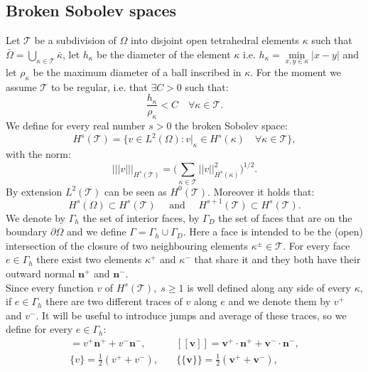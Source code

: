 \documentclass[12pt, a4paper]{article}
\theoremstyle{definition}
\theoremstyle{plain}
\theoremstyle{plain}
\theoremstyle{definition}
\begin{document}
\subsection{Broken Sobolev spaces}
Let $\mathcal{T}$ be a subdivision of $\Omega$ into disjoint open tetrahedral elements $\kappa$ such that $\bar{\Omega} = \bigcup\limits_{\kappa \in \mathcal{T}} \bar{\kappa}$, let $h_\kappa$ be the diameter of the element $\kappa$ i.e. $h_\kappa = \min\limits_{x, y \in \kappa} |x-y|$ and let $\rho_\kappa$ be the maximum diameter of a ball inscribed in $\kappa$. For the moment we assume $\mathcal{T}$ to be regular, i.e. that $\exists C > 0$ such that:
\begin{equation*}
	\frac{h_\kappa}{\rho_\kappa} < C \quad \forall \kappa \in \mathcal{T}.
\end{equation*}
We define for every real number $s>0$ the broken Sobolev space:
\begin{equation*}
	H^s(\mathcal{T}) = \{ v \in L^2(\Omega) : v|_\kappa \in H^s(\kappa) \quad 
	\forall \kappa \in \mathcal{T} \},
\end{equation*}
with the norm:
\begin{equation*}
	|\!|\!|v|\!|\!|_{H^s(\mathcal{T})} = \bigg( \sum_{\kappa \in \mathcal{T}} |\!|v|\!|_{H^s(\kappa)}^2 \bigg)^{1/2}.
\end{equation*}
By extension $L^2(\mathcal{T})$ can be seen as $H^0(\mathcal{T})$. Moreover it holds that:
\begin{equation*}
	H^s(\Omega) \subset H^s(\mathcal{T}) \quad \text{ and } \quad 
	H^{s+1}(\mathcal{T}) \subset H^s(\mathcal{T}).
\end{equation*}
We denote by $\Gamma_h$ the set of interior faces, by $\Gamma_D$ the set of 
faces that are on the boundary $\partial \Omega$ and we define $\Gamma = 
\Gamma_h \cup \Gamma_D$. Here a face is intended to be the (open) intersection 
of the closure of two neighbouring elements $\kappa^\pm \in \mathcal{T}$. For 
every face $e \in \Gamma_h$ there exist two elements 
$\kappa^+$ and $\kappa^-$ that share it and they both have their outward normal 
$\mathbf{n}^+$ and $\mathbf{n}^-$.\\
Since every function $v$ of $H^s(\mathcal{T}), \; s \geq 1$ is well defined 
along any side of every $\kappa$, if $e \in \Gamma_h$ there are two different 
traces of $v$ along $e$ and we denote them by $v^+$ and $v^-$.
It will be useful to introduce jumps and average of these traces, so we 
define for every $e \in \Gamma_h$:
\begin{align}
	[v] = v^+ \mathbf{n}^+ + v^- \mathbf{n}^-,
	&\quad [\![ \mathbf{v} ]\!] = \mathbf{v}^+ \cdot \mathbf{n}^+ + \mathbf{v}^- \cdot \mathbf{n}^-, \label{eq:jump} \\
	\{v\} = \frac{1}{2} (v^+ + v^-) ,
	& \quad \{\!\!\{ \mathbf{v} \}\!\!\} = \frac{1}{2} (\mathbf{v}^+ +\mathbf{v}^-), \label{eq:aver}
\end{align}
\end{document}
